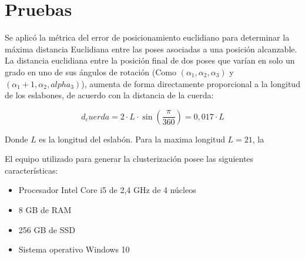 \section{Pruebas}

Se aplicó la métrica del error de posicionamiento euclidiano para determinar la máxima distancia Euclidiana entre las poses asociadas a una posición alcanzable. La distancia euclidiana entre la posición final de dos poses que varían en solo un grado en uno de sus ángulos de rotación (Como $(\alpha_1,\alpha_2,\alpha_3)$ y $(\alpha_1 + 1, \alpha_2, alpha_3)$), aumenta de forma directamente proporcional a la longitud de los eslabones, de acuerdo con la distancia de la cuerda:

\begin{equation}
	d_cuerda = 2 \cdot L \cdot \sin(\frac{\pi}{360}) = 0,017 \cdot L
\end{equation}

Donde $L$ es la longitud del eslabón. Para la maxima longitud $L = 21$, la 

El equipo utilizado para generar la clusterización posee las siguientes características:

\begin{itemize}
	\item Procesador Intel Core i5 de 2,4 GHz de 4 núcleos
	\item 8 GB de RAM
	\item 256 GB de SSD
	\item Sistema operativo Windows 10
\end{itemize}

